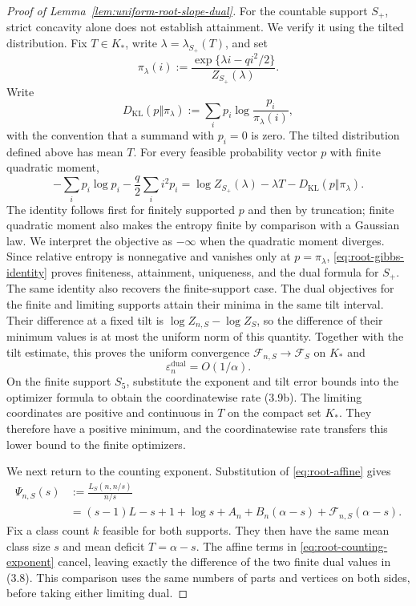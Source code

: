 \documentclass[a4paper,10pt,reqno]{amsart}
\numberwithin{equation}{section}
\newcommand{\displayheading}[1]{\par\addvspace{0.68\baselineskip}\noindent{\scshape #1.}\par\nobreak\smallskip\noindent}
\theoremstyle{plain}
\theoremstyle{remark}
\begin{document}
\begin{proof}[Proof of Lemma~\ref{lem:uniform-root-slope-dual}]
For the countable support $S_+$, strict concavity alone does not establish
attainment. We verify it using the tilted distribution. Fix $T\in K_*$,
write $\lambda=\lambda_{S_+}(T)$, and set
\[
 \pi_\lambda(i):=
 \frac{\exp\{\lambda i-q i^2/2\}}{Z_{S_+}(\lambda)}.
\]
Write
\[
  D_{\mathrm{KL}}(p\Vert\pi_\lambda)
  :=\sum_i p_i\log\frac{p_i}{\pi_\lambda(i)},
\]
with the convention that a summand with $p_i=0$ is zero.
The tilted distribution defined above has mean $T$. For every feasible
probability vector $p$ with finite quadratic moment,
\begin{equation}
 -\sum_i p_i\log p_i-\frac q2\sum_i i^2p_i
 =\log Z_{S_+}(\lambda)-\lambda T
  -D_{\mathrm{KL}}(p\Vert\pi_\lambda).
 \label{eq:root-gibbs-identity}
\end{equation}
The identity follows first for finitely supported $p$ and then by truncation;
finite quadratic moment also makes the entropy finite by comparison with a
Gaussian law.  We interpret the objective as $-\infty$ when the quadratic
moment diverges.  Since relative entropy is nonnegative and vanishes only at
$p=\pi_\lambda$, \eqref{eq:root-gibbs-identity} proves finiteness, attainment, uniqueness, and the
dual formula for $S_+$.  The same identity also recovers the finite-support
case. The dual objectives for the finite and limiting supports attain
their minima in the same tilt interval. Their difference at a fixed tilt
is $\log Z_{n,S}-\log Z_S$, so the difference of their minimum values is
at most the uniform norm of this quantity. Together with the tilt estimate,
this proves the uniform convergence $\mathcal F_{n,S}\to\mathcal F_S$ on
$K_*$ and
\[
  \varepsilon_n^{\mathrm{dual}}=O(1/\alpha).
\]
On the finite support $S_5$, substitute the exponent and tilt error bounds into
the optimizer formula to obtain the coordinatewise rate (3.9b). The limiting
coordinates are positive and continuous in $T$ on the compact set $K_*$.
They therefore have a positive minimum, and the coordinatewise rate transfers
this lower bound to the finite optimizers.

\displayheading{Exact cancellation between supports}
We next return to the counting exponent. Substitution of \eqref{eq:root-affine} gives
\begin{equation}
\begin{split}
  \Psi_{n,S}(s)
  &:=\frac{L_S(n,n/s)}{n/s}\\
  &=(s-1)L-s+1+\log s
    +A_n+B_n(\alpha-s)
    +\mathcal F_{n,S}(\alpha-s).
\end{split}
  \label{eq:root-counting-exponent}
\end{equation}
Fix a class count $k$ feasible for both supports. They then have the same
mean class size $s$ and mean deficit $T=\alpha-s$. The affine terms in
\eqref{eq:root-counting-exponent} cancel, leaving exactly the difference of
the two finite dual values in (3.8). This comparison uses the same numbers
of parts and vertices on both sides, before taking either limiting dual.


\end{proof}
\end{document}

